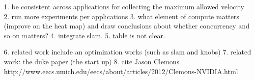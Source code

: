 1. be consistent across applications for collecting the maximum allowed velocity
2. run more experiments per applications
3. what element of compute matters (improve on the heat map) and draw conclusions about whether concurrency and so on matters?
4. integrate slam. 
5. table is not clear.

6. related work include an optimization works (such as slam and knobs) 
7. related work: the duke paper (the start up)
8. cite Jason Clemons http://www.eecs.umich.edu/eecs/about/articles/2012/Clemons-NVIDIA.html

